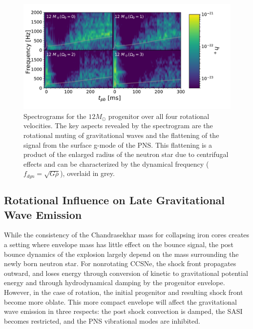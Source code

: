 \documentclass[twocolumn,times]{aastex62}  %
\begin{document}
\begin{figure}[t]
    \centering
    \includegraphics[scale=0.38]{figures/gws_2x2_line_M1.pdf}
    \caption{Spectrograms for the $12 M_\odot$ progenitor over all four rotational velocities.  The key aspects revealed by the spectrogram are the rotational muting of gravitational waves and the flattening of the signal from the surface g-mode of the PNS.  This flattening is a product of the enlarged radius of the neutron star due to centrifugal effects and can be characterized by the dynamical frequency ($f_{dyn} = \sqrt{G \overline{\rho}}$), overlaid in grey.}
    \label{fig:2x2}
\end{figure}


\subsection{Rotational Influence on Late Gravitational Wave Emission}


While the consistency of the Chandrasekhar mass for collapsing iron cores creates a setting where envelope mass has little effect on the bounce signal, the post bounce dynamics of the explosion largely depend on the mass surrounding the newly born neutron star.  For nonrotating CCSNe, the shock front propagates outward, and loses energy through conversion of kinetic to gravitational potential energy and through hydrodynamical damping by the progenitor envelope.  However, in the case of rotation, the initial progenitor and resulting shock front become more oblate.  This more compact envelope will affect the gravitational wave emission in three respects: the post shock convection is damped, the SASI becomes restricted, and the PNS vibrational modes are inhibited. 
\end{document}
